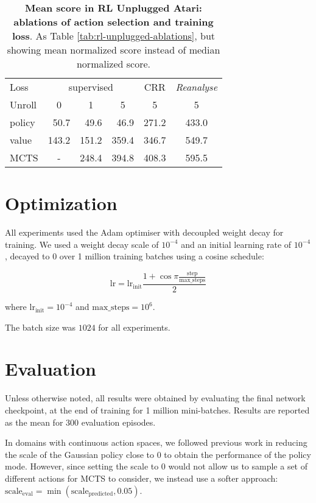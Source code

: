 \documentclass{article}
\newcommand{\reanalyse}{\emph{Reanalyse}}
\begin{document}
\begin{table}[t]
\begin{center}\begin{tabularx}{\columnwidth}{l|rrrcc}
\toprule
Loss &  \multicolumn{3}{c}{supervised} & CRR & \reanalyse{} \\
Unroll & \multicolumn{1}{c}{0} & \multicolumn{1}{c}{1}  & \multicolumn{1}{c}{5} & 5 & 5 \\
\midrule
policy & 50.7 & 49.6 & 46.9 & 271.2 & 433.0\\
value & 143.2 & 151.2 & 359.4 & 346.7 & 549.7\\
MCTS &  \multicolumn{1}{c}{-}  & 248.4 & 394.8 & 408.3 & 595.5\\
\bottomrule
\end{tabularx}
\end{center}
 \caption{
\label{tab:rl-unplugged-ablations-mean}
\textbf{Mean score in RL Unplugged Atari: ablations of action selection and training loss}. As Table \ref{tab:rl-unplugged-ablations}, but showing mean normalized score instead of median normalized score.
}
\end{table}


\section{Optimization}

All experiments used the Adam optimiser \cite{adam} with decoupled weight decay \cite{adam_weight_decay} for training. We used a weight decay scale of $10^{-4}$ and an initial learning rate of $10^{-4}$, decayed to 0 over 1 million training batches using a cosine schedule:

$$\text{lr} = \text{lr}_\text{init} \frac{1 + \cos{\pi \frac{\text{step}}{\text{max\_steps}} }}{2}$$

where $\text{lr}_\text{init} = 10^{-4}$ and $\text{max\_steps} = 10^6$.

The batch size was $1024$ for all experiments.

\section{Evaluation}

Unless otherwise noted, all results were obtained by evaluating the final network checkpoint, at the end of training for 1 million mini-batches. Results are reported as the mean for 300 evaluation episodes.



In domains with continuous action spaces, we followed previous work \cite{rl_unplugged} in reducing the scale of the Gaussian policy close to 0 to obtain the performance of the policy mode. However, since setting the scale to 0 would not allow us to sample a set of different actions for MCTS to consider, we instead use a softer approach: $\text{scale}_{\text{eval}} = \min(\text{scale}_{\text{predicted}}, 0.05)$.
\end{document}

